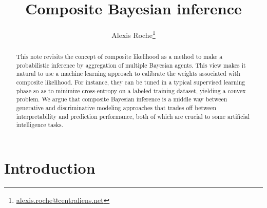 \documentclass[english]{scrartcl}
\title{Composite Bayesian inference}
\date{}
\author{Alexis Roche\thanks{\url{alexis.roche@centraliens.net}}}
\begin{document}
\maketitle

\begin{abstract}
This note revisits the concept of composite likelihood as a method to make a probabilistic inference by aggregation of multiple Bayesian agents. This view makes it natural to use a machine learning approach to calibrate the weights associated with composite likelihood. For instance, they can be tuned in a typical supervised learning phase so as to minimize cross-entropy on a labeled training dataset, yielding a convex problem. We argue that composite Bayesian inference is a middle way between generative and discriminative modeling approaches that trades off between interpretability and prediction performance, both of which are crucial to some artificial intelligence tasks.
\end{abstract}



\section{Introduction}
\label{sec:intro}
\end{document}
